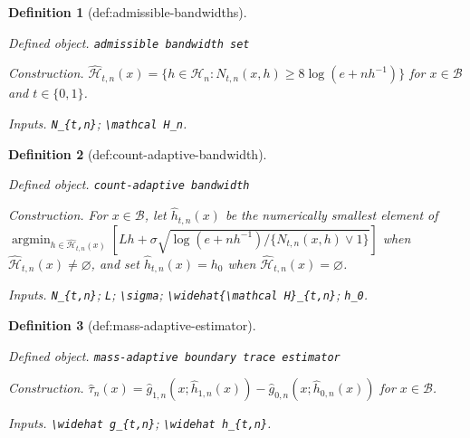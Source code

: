 \documentclass{article}
\newtheorem{definition}{Definition}
\begin{document}
\begin{definition}[def:admissible-bandwidths]\label{def:admissible-bandwidths}
\par\smallskip\noindent\emph{Defined object.} \texttt{admissible bandwidth set}
\par\smallskip\noindent\emph{Construction.} \(\widehat{\mathcal H}_{t,n}(x)=\{h\in\mathcal H_n:N_{t,n}(x,h)\ge8\log(e+nh^{-1})\}\) for \(x\in\mathcal B\) and \(t\in\{0,1\}\).
\par\smallskip\noindent\emph{Inputs.} \texttt{N\_\allowbreak{}\{t,\allowbreak{}n\}\allowbreak{}}; \texttt{\textbackslash{}\allowbreak{}mathcal H\_\allowbreak{}n}.
\end{definition}

\begin{definition}[def:count-adaptive-bandwidth]\label{def:count-adaptive-bandwidth}
\par\smallskip\noindent\emph{Defined object.} \texttt{count-\allowbreak{}adaptive bandwidth}
\par\smallskip\noindent\emph{Construction.} For \(x\in\mathcal B\), let \(\widehat h_{t,n}(x)\) be the numerically smallest element of \(\operatorname*{argmin}_{h\in\widehat{\mathcal H}_{t,n}(x)}[Lh+\sigma\sqrt{\log(e+nh^{-1})/\{N_{t,n}(x,h)\vee1\}}]\) when \(\widehat{\mathcal H}_{t,n}(x)\ne\varnothing\), and set \(\widehat h_{t,n}(x)=h_0\) when \(\widehat{\mathcal H}_{t,n}(x)=\varnothing\).
\par\smallskip\noindent\emph{Inputs.} \texttt{N\_\allowbreak{}\{t,\allowbreak{}n\}\allowbreak{}}; \texttt{L}; \texttt{\textbackslash{}\allowbreak{}sigma}; \texttt{\textbackslash{}\allowbreak{}widehat\{\textbackslash{}\allowbreak{}mathcal H\}\allowbreak{}\_\allowbreak{}\{t,\allowbreak{}n\}\allowbreak{}}; \texttt{h\_\allowbreak{}0}.
\end{definition}

\begin{definition}[def:mass-adaptive-estimator]\label{def:mass-adaptive-estimator}
\par\smallskip\noindent\emph{Defined object.} \texttt{mass-\allowbreak{}adaptive boundary trace estimator}
\par\smallskip\noindent\emph{Construction.} \(\widehat\tau_n(x)=\widehat g_{1,n}(x;\widehat h_{1,n}(x))-\widehat g_{0,n}(x;\widehat h_{0,n}(x))\) for \(x\in\mathcal B\).
\par\smallskip\noindent\emph{Inputs.} \texttt{\textbackslash{}\allowbreak{}widehat g\_\allowbreak{}\{t,\allowbreak{}n\}\allowbreak{}}; \texttt{\textbackslash{}\allowbreak{}widehat h\_\allowbreak{}\{t,\allowbreak{}n\}\allowbreak{}}.
\end{definition}
\end{document}
